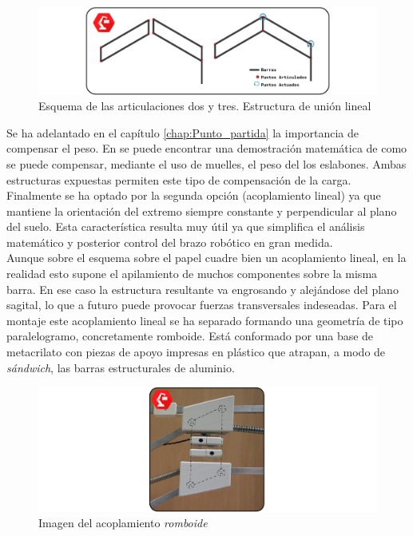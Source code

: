     \begin{figure}[H]
    	\centering
    	\includegraphics[width=\textwidth]{figuras/Imagenes_Mecanica/mecanismos_4_barras.jpg}
    	\caption{Esquema de las articulaciones dos y tres. Estructura de unión lineal}
    	\label{fig:Mecanica:4_bar_mecanism}
    \end{figure}

    Se ha adelantado en el capítulo \ref{chap:Punto_partida} la importancia de compensar el peso. En \cite{Rahman_asimple} se puede encontrar una demostración matemática de como se puede compensar, mediante el uso de muelles, el peso del los eslabones. Ambas estructuras expuestas permiten este tipo de compensación de la carga. Finalmente se ha optado por la segunda opción (acoplamiento lineal) ya que mantiene la orientación del extremo siempre constante y perpendicular al plano del suelo. Esta característica resulta muy útil ya que simplifica el análisis matemático y posterior control del brazo robótico en gran medida.
    \\

    Aunque sobre el esquema sobre el papel cuadre bien un acoplamiento lineal, en la realidad esto supone el apilamiento de muchos componentes sobre la misma barra. En ese caso la estructura resultante va engrosando y alejándose del plano sagital, lo que a futuro puede provocar fuerzas transversales indeseadas. Para el montaje este acoplamiento lineal se ha separado formando una geometría de tipo paralelogramo, concretamente romboide. Está conformado por una base de metacrilato con piezas de apoyo impresas en plástico que atrapan, a modo de \textit{sándwich}, las barras estructurales de aluminio.

    \begin{figure}[H]
        \centering
        \includegraphics[width=\textwidth]{figuras/Imagenes_Mecanica/acoplamiento_romboide.jpg}
        \caption{Imagen del acoplamiento \textit{romboide}}
        \label{fig:Mecanica:acoplamiento_romboide}
    \end{figure}

